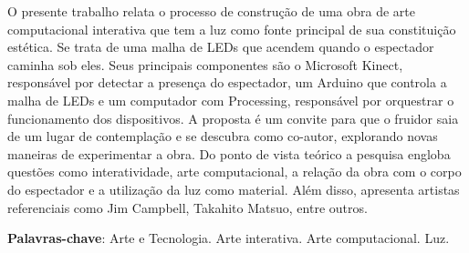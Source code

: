 \begin{RESUMO}
\thispagestyle{empty}
	\begin{SingleSpace}
	
		\hspace{-1.3 cm}O presente trabalho relata o processo de construção de uma obra de arte computacional interativa que tem a luz como fonte principal de sua constituição estética. Se trata de uma malha de LEDs que acendem quando o espectador caminha sob eles. Seus principais componentes são o Microsoft Kinect, responsável por detectar a presença do espectador, um Arduino que controla a malha de LEDs e um computador com Processing, responsável por orquestrar o funcionamento dos dispositivos. A proposta é um convite para que o fruidor saia de um lugar de contemplação e se descubra como co-autor, explorando novas maneiras de experimentar a obra.
		Do ponto de vista teórico a pesquisa engloba questões como interatividade, arte computacional, a relação da obra com o corpo do espectador e a utilização da luz como material. Além disso, apresenta artistas referenciais como Jim Campbell, Takahito Matsuo, entre outros.
		
		\vspace*{0.5cm}\hspace{-1.3 cm}\textbf{Palavras-chave}: Arte e Tecnologia. Arte interativa. Arte computacional. Luz.
		
	\end{SingleSpace}
\end{RESUMO}


